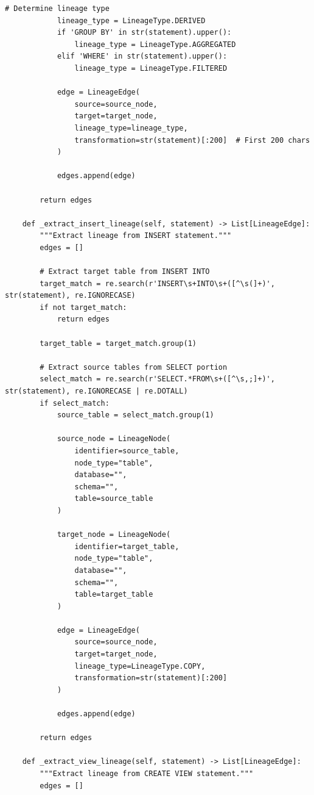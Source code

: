 \begin{lstlisting}[style=python, caption=LineageTracker with Column-Level Dependencies]
            # Determine lineage type
            lineage_type = LineageType.DERIVED
            if 'GROUP BY' in str(statement).upper():
                lineage_type = LineageType.AGGREGATED
            elif 'WHERE' in str(statement).upper():
                lineage_type = LineageType.FILTERED

            edge = LineageEdge(
                source=source_node,
                target=target_node,
                lineage_type=lineage_type,
                transformation=str(statement)[:200]  # First 200 chars
            )

            edges.append(edge)

        return edges

    def _extract_insert_lineage(self, statement) -> List[LineageEdge]:
        """Extract lineage from INSERT statement."""
        edges = []

        # Extract target table from INSERT INTO
        target_match = re.search(r'INSERT\s+INTO\s+([^\s(]+)', str(statement), re.IGNORECASE)
        if not target_match:
            return edges

        target_table = target_match.group(1)

        # Extract source tables from SELECT portion
        select_match = re.search(r'SELECT.*FROM\s+([^\s,;]+)', str(statement), re.IGNORECASE | re.DOTALL)
        if select_match:
            source_table = select_match.group(1)

            source_node = LineageNode(
                identifier=source_table,
                node_type="table",
                database="",
                schema="",
                table=source_table
            )

            target_node = LineageNode(
                identifier=target_table,
                node_type="table",
                database="",
                schema="",
                table=target_table
            )

            edge = LineageEdge(
                source=source_node,
                target=target_node,
                lineage_type=LineageType.COPY,
                transformation=str(statement)[:200]
            )

            edges.append(edge)

        return edges

    def _extract_view_lineage(self, statement) -> List[LineageEdge]:
        """Extract lineage from CREATE VIEW statement."""
        edges = []


\end{lstlisting}
